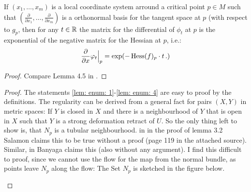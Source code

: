 \begin{lemma}
  If $(x_1,\dots ,x_m)$ is a local coordinate system arround a critical point $p\in M$ such that $\left( \frac{\partial}{\partial x_1},\dots ,\frac{\partial}{\partial x_m}\right)$ is a orthonormal basis for the tangent space at $p$ (with respect to $g_p$, then for any $t\in \mathbb{R}$ the matrix for the differential of $\phi_t$ at $p$ is the exponential of the negative matrix for the Hessian at $p$, i.e.:
  \begin{equation*}
      \frac{\partial}{\partial x} \varphi_t \Big| _p=\exp(-\operatorname{\mathrm{Hess}}(f)_p\cdot t \, .)
  \end{equation*}
\end{lemma}
\begin{proof}
    Compare Lemma 4.5 in \cite{banyaga2004lectures}.
\end{proof}
\begin{proof}
    The statements \ref{lem: enum: 1}-\ref{lem: enum: 4} are easy to proof by the definitions. The regularity can be derived from a general fact for pairs $(X,Y)$ in metric spaces: If $Y$ is closed in $X$ and there is a neighbourhood of $Y$ that is open in $X$ such that $Y$ is a strong deformation retract of $U$. So the only thing left to show is, that $N_p$ is a tubular neighbourhood. in \cite{MorseTheorySalmbon} in the proof of lemma 3.2 Salamon claims this to be true without a proof (page 119 in the attached source). Similar, in \cite{banyaga2004lectures} Banyaga claims this (also without any argument).
  I find this difficult to proof, since we cannot use the flow for the map from the normal bundle, as points leave $N_p$ along the flow: The Set $N_p$ is sketched in the figure below. 
    \begin{center}
        

\end{center}
\end{proof}
